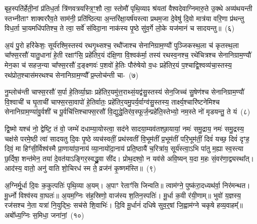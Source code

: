 बृह॒स्पति॑र्\mbox{}हेती॒नां प्र॑तिध॒र्ता त्रि॑णवत्रयस्त्रि॒ꣳ॒शौ त्वा॒ स्तोमौ॑ पृथि॒व्याꣴ श्र॑यतां वैश्वदेवाग्निमारु॒ते उ॒क्थे अव्य॑थयन्ती स्तभ्नीताꣳ शाक्वररैव॒ते साम॑नी॒ प्रति॑ष्ठित्या अ॒न्तरि॑क्षा॒यर्\mbox{}ष॑यस्त्वा प्रथम॒जा दे॒वेषु॑ दि॒वो मात्र॑या वरि॒णा प्र॑थन्तु विध॒र्ता चा॒यमधि॑\-पतिश्च॒ ते त्वा॒ सर्वे॑ संविदा॒ना नाक॑स्य पृ॒ष्ठे सु॑व॒र्गे लो॒के यज॑मानं च सादयन्तु॥~(६)

{\anuvakamend[{प्र॒तीची॒ दिङ्म॒रुत॑स्ते दे॒वा अधि॑पतयश्चत्वारि॒ꣳ॒शच्च॑}]}%

अ॒यं पु॒रो हरि॑केशः॒ सूर्य॑रश्मि॒स्तस्य॑ रथगृ॒थ्सश्च॒ रथौ॑जाश्च सेनानिग्राम॒ण्यौ॑ पुञ्जिकस्थ॒ला च॑ कृतस्थ॒ला चा᳚फ्स॒रसौ॑ यातु॒धाना॑ हे॒ती रक्षाꣳ॑सि॒ प्रहे॑तिर॒यं द॑क्षि॒णा वि॒श्वक॑र्मा॒ तस्य॑ रथस्व॒नश्च॒ रथे॑चित्रश्च सेनानिग्राम॒ण्यौ॑ मेन॒का च॑ सहज॒न्या चा᳚फ्स॒रसौ॑ द॒ङ्क्ष्णवः॑ प॒शवो॑ हे॒तिः पौरु॑षेयो व॒धः प्रहे॑तिर॒यं प॒श्चाद्वि॒श्वव्य॑चा॒स्तस्य॒ रथ॑प्रोत॒श्चास॑मरथश्च सेनानिग्राम॒ण्यौ᳚ प्र॒म्लोच॑न्ती चा-~(७)

नु॒म्लोच॑न्ती चाफ्स॒रसौ॑ स॒र्पा हे॒तिर्व्या॒घ्राः प्रहे॑तिर॒यमु॑त्त॒राथ्\-सं॒यद्व॑सु॒स्तस्य॑ सेन॒जिच्च॑ सु॒षेण॑श्च सेनानिग्राम॒ण्यौ॑ वि॒श्वाची॑ च घृ॒ताची॑ चाफ्स॒रसा॒वापो॑ हे॒तिर्वातः॒ प्रहे॑ति\-र॒यमु॒पर्य॒र्वाग्व॑सु॒स्तस्य॒ तार्क्ष्य॒श्चारि॑ष्टनेमिश्च सेनानिग्राम॒ण्या॑\-वु॒र्वशी॑ च पू॒र्वचि॑त्तिश्चाफ्स॒रसौ॑ वि॒द्युद्धे॒तिर॑व॒स्फूर्ज॒न्प्रहे॑ति॒स्तेभ्यो॒ नम॒स्ते नो॑ मृडयन्तु॒ ते यं~(८)

द्वि॒ष्मो यश्च॑ नो॒ द्वेष्टि॒ तं वो॒ जम्भे॑ दधाम्या॒योस्त्वा॒ सद॑ने सादया॒म्यव॑तश्छा॒यायां॒ नमः॑ समु॒द्राय॒ नमः॑ समु॒द्रस्य॒ चक्ष॑से परमे॒ष्ठी त्वा॑ सादयतु दि॒वः पृ॒ष्ठे व्यच॑स्वतीं॒ प्रथ॑स्वतीं वि॒भूम॑तीं प्र॒भूम॑तीं परि॒भूम॑तीं॒ दिवं॑ यच्छ॒ दिवं॑ दृꣳह॒ दिवं॒ मा हिꣳ॑सी॒र्विश्व॑स्मै प्रा॒णाया॑पा॒नाय॑ व्या॒नायो॑दा॒नाय॑ प्रति॒ष्ठायै॑ च॒रित्रा॑य॒ सूर्य॑स्त्वा॒ऽभि पा॑तु म॒ह्या स्व॒स्त्या छ॒र्दिषा॒ शन्त॑मेन॒ तया॑ दे॒वत॑या\-ऽ\-ङ्गिर॒स्वद्ध्रु॒वा सी॑द। प्रोथ॒दश्वो॒ न यव॑से अवि॒ष्यन् य॒दा म॒हः सं॒वर॑णा॒द्व्यस्था᳚त्। आद॑स्य॒ वातो॒ अनु॑ वाति शो॒चिरध॑ स्म ते॒ व्रज॑नं कृ॒ष्णम॑स्ति॥~(९)

{\anuvakamend[{प्र॒म्लोच॑न्ती च॒ यꣴ स्व॒स्त्याष्टाविꣳ॑शतिश्च}]}%

अ॒ग्निर्मू॒र्धा दि॒वः क॒कुत्पतिः॑ पृथि॒व्या अ॒यम्। अ॒पाꣳ रेताꣳ॑सि जिन्वति॥ त्वाम॑ग्ने॒ पुष्क॑रा॒दध्यथ॑र्वा॒ निर॑मन्थत। मू॒र्ध्नो विश्व॑स्य वा॒घतः॑॥ अ॒यम॒ग्निः स॑ह॒स्रिणो॒ वाज॑स्य श॒तिन॒स्पतिः॑। मू॒र्धा क॒वी र॑यी॒णाम्॥ भुवो॑ य॒ज्ञस्य॒ रज॑सश्च ने॒ता यत्रा॑ नि॒युद्भिः॒ सच॑से शि॒वाभिः॑। दि॒वि मू॒र्धानं॑ दधिषे सुव॒र्॒\mbox{}षां जि॒ह्वाम॑ग्ने चकृषे हव्य॒वाहम्᳚॥ अबो᳚ध्य॒ग्निः स॒मिधा॒ जना॑नां॒~(१०)

